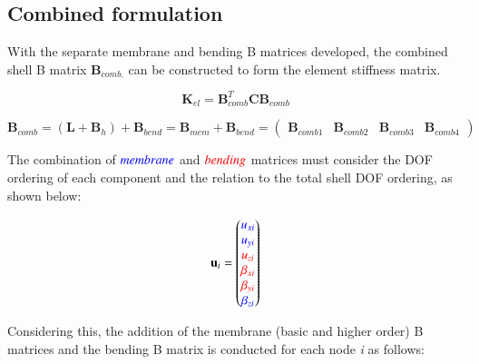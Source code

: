 \subsection{Combined formulation}

With the separate membrane and bending B matrices developed, the combined shell B matrix $\mathbf{B}_{comb.}$ can be constructed to form the element stiffness matrix.

\begin{equation} 
\mathbf{K}_{el} = \mathbf{B}_{comb}^T \mathbf{C} \mathbf{B}_{comb} 
\label{equation30}
\end{equation}

\begin{equation} 
\mathbf{B}_{comb} = (\mathbf{L} + \mathbf{B}_h) + \mathbf{B}_{bend} = \mathbf{B}_{mem} + \mathbf{B}_{bend} = 
\begin{pmatrix}
\mathbf{B}_{comb1} & \mathbf{B}_{comb2} & \mathbf{B}_{comb3} & \mathbf{B}_{comb4}
\end{pmatrix}
\label{equation31}
\end{equation}

The combination of $\textcolor{blue}{membrane}$ and $\textcolor{red}{bending}$ matrices must consider the DOF ordering of each component and the relation to the total shell DOF ordering, as shown below:

\begin{equation} 
\mathbf{u}_i = 
\begin{pmatrix}
\textcolor{blue}{u_{xi}} \\ 
\textcolor{blue}{u_{yi}} \\ 
\textcolor{red}{u_{zi}} \\ 
\textcolor{red}{\beta_{xi}} \\ 
\textcolor{red}{\beta_{yi}} \\ 
\textcolor{blue}{\beta_{zi}} \\ 
\end{pmatrix}
\label{equation32}
\end{equation}

Considering this, the addition of the membrane (basic and higher order) B matrices and the bending B matrix is conducted for each node \textit{i} as follows:

